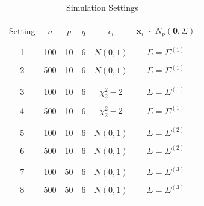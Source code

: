 \documentclass[ejs,authoryear,linksfromyear]{imsart}
\numberwithin{equation}{section}
\theoremstyle{plain}
\begin{document}
\begin{table}[h!] 
	\caption{Simulation Settings} \label{tabl:simul_setting}
	\centering
	\begin{tabular}{cccccc}
		\hline
		\\[-.5em]
		Setting & $n$ & $p$ & $q$ & $\epsilon_i$ & $\bm{x}_i \sim N_p(\bm{0},\Sigma)$ \\
		\\[-.5em]
		\hline
		\\[-.5em]
		1 & 100 & 10 & 6 & $N(0,1)$ & $\Sigma = \Sigma^{(1)}$ \\ 
		\\[-.5em]
		2 & 500 & 10 & 6 & $N(0,1)$ & $\Sigma = \Sigma^{(1)}$ \\
		\\[-.5em]
		\hline 
		\\[-.5em]
		3 & 100 & 10 & 6 & $\chi^2_2 - 2$ & $\Sigma = \Sigma^{(1)}$ \\ 
		\\[-.5em]
		4 & 500 & 10 & 6 & $\chi^2_2 - 2$ & $\Sigma = \Sigma^{(1)}$ \\ 
		\\[-.5em]
		\hline
		\\[-.5em]
		5 & 100 & 10 & 6 & $N(0,1)$ & $\Sigma = \Sigma^{(2)}$ \\ 
		\\[-.5em]
		6 & 500 & 10 & 6 & $N(0,1)$ & $\Sigma = \Sigma^{(2)}$ \\ 
		\\[-.5em]
		\hline
		\\[-.5em]
		7 & 100 & 50 & 6 & $N(0,1)$ & $\Sigma = \Sigma^{(3)}$ \\ 
		\\[-.5em]
		8 & 500 & 50 & 6 & $N(0,1)$ & $\Sigma = \Sigma^{(3)}$ \\ 
		\\[-.5em]
		\hline
	\end{tabular}
\end{table}
\end{document}
